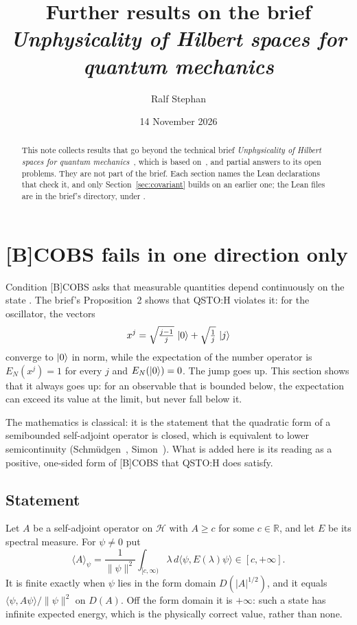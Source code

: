 \documentclass[11pt]{article}
\title{Further results on the brief\\ \emph{Unphysicality of Hilbert spaces for quantum mechanics}}
\author{Ralf Stephan}
\date{14 November 2026}
\theoremstyle{remark}
\newcommand{\Hil}{\mathcal H}
\newcommand{\ip}[2]{\langle #1, #2\rangle}
\begin{document}
\maketitle

\begin{abstract}
  This note collects results that go beyond the technical brief \emph{Unphysicality of Hilbert
  spaces for quantum mechanics}~\cite{brief}, which is based on~\cite{cca}, and partial answers to its open problems. They are
  not part of the brief. Each section names the Lean declarations that check it, and only
  Section~\ref{sec:covariant} builds on an earlier one; the Lean files are in the brief's directory, under
  .
\end{abstract}

\section{[B]COBS fails in one direction only}
\label{sec:lsc}

Condition [B]COBS asks that measurable quantities depend continuously on the state
\cite{reverse}. The brief's Proposition~2 shows that QSTO:H violates it: for the oscillator, the
vectors
\[
  x^j = \sqrt{\tfrac{j-1}{j}}\,\ket{0} + \sqrt{\tfrac1j}\,\ket{j}
\]
converge to $\ket{0}$ in norm, while the expectation of the number operator is
$E_N(x^j) = 1$ for every $j$ and $E_N(\ket{0}) = 0$. The jump goes up. This section shows that it
always goes up: for an observable that is bounded below, the expectation can exceed its value at
the limit, but never fall below it.

The mathematics is classical: it is the statement that the quadratic form of a semibounded
self-adjoint operator is closed, which is equivalent to lower semicontinuity
(Schmüdgen~\cite[Prop.~10.1]{schmudgen}, Simon~\cite[Thm.~10.14]{simon}). What is added here is its
reading as a positive, one-sided form of [B]COBS that QSTO:H does satisfy.

\subsection{Statement}

Let $A$ be a self-adjoint operator on $\Hil$ with $A \ge c$ for some $c \in \mathbb R$, and let
$E$ be its spectral measure. For $\psi \ne 0$ put
\[
  \langle A\rangle_\psi = \frac{1}{\|\psi\|^2} \int_{[c,\infty)} \lambda \, d\ip{\psi}{E(\lambda)\psi}
  \in [c, +\infty].
\]
It is finite exactly when $\psi$ lies in the form domain $D(|A|^{1/2})$, and it equals
$\ip{\psi}{A\psi}/\|\psi\|^2$ on $D(A)$. Off the form domain it is $+\infty$: such a state has
infinite expected energy, which is the physically correct value, rather than none.
\end{document}
